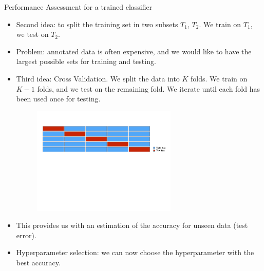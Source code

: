 \documentclass[xcolor=pdftex,dvipsnames,table]{beamer}
\begin{document}
\begin{frame}{Performance Assessment for a trained classifier}
	\begin{itemize}
		\item<1-> Second idea: to split the training set in two subsets $T_1$, $T_2$. We train on $T_1$, we test on $T_2$.
		\item<2-> Problem: annotated data is often expensive, and we would like to have the largest possible sets for training and testing.
		\item<3-> Third idea: Cross Validation. We split the data into $K$ folds. We train on $K-1$ folds, and we test on the remaining fold. We iterate until each fold has been used once for testing.
		\begin{figure}[htb]
			\includegraphics[width=0.65\textwidth]{../graphics/CV1.pdf}
		\end{figure}
		\item<4-> This provides us with an estimation of the accuracy for unseen data (test error).
		\item<5-> Hyperparameter selection: we can now choose the hyperparameter with the best accuracy.
	\end{itemize}
\end{frame}
\end{document}
